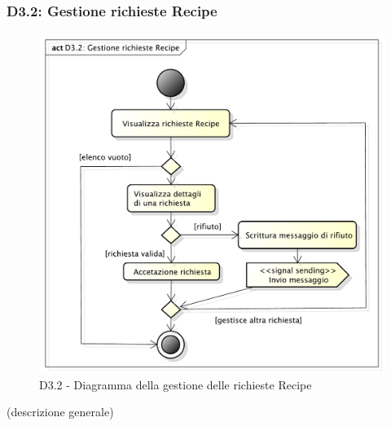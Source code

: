 		\subsubsection{D3.2: Gestione richieste Recipe} %
		\label{ssub:gestione_richieste_recipe}
		\begin{figure}[!htbp]
			\centering
			\centerline{\includegraphics[scale=0.45]{./images/D3_2.pdf}}
			\caption{D3.2 - Diagramma della gestione delle richieste Recipe}
		\end{figure}
		\noindent
		[TO DO] (descrizione generale)

